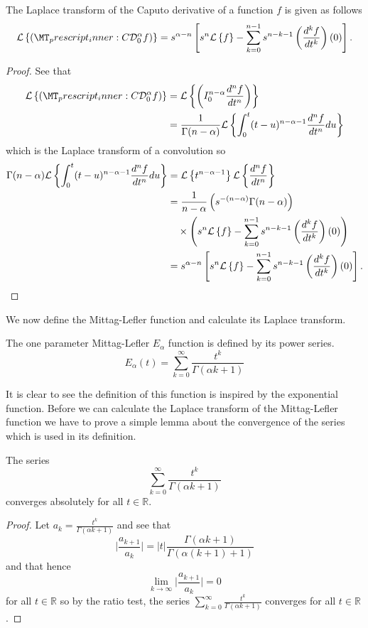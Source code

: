 \documentclass{unswmaths}
\begin{document}
\begin{lemma}
\label{lem:lap_cap}
	The Laplace transform of the Caputo derivative of  a function $ f $ is given as follows
	\begin{align*}
		\laplace{\capder{0}{\alpha}{f}} = s^{\alpha - n} \left[ s^n \laplace{f} - \sum_{k=0}^{n-1} s^{n-k-1} \left( \der{f}{t}{k} \right)(0) \right].
	\end{align*}
\end{lemma}
\begin{proof}
	See that
	\begin{align*}
		\laplace{\capder{0}{\alpha}{f}} &= \laplace{  \rli{0}{n-\alpha}{\der{f}{t}{n}}} \\
			&= \frac{1}{\Gamma(n-\alpha)}\laplace{ \int_0^t (t-u)^{n-\alpha-1} \der{f}{t}{n} du} \\ 
	\end{align*}
	which is the Laplace transform of a convolution so
	\begin{align*}
		\Gamma(n-\alpha)\mathcal{L} \left\{  \int_0^t (t-u)^{n-\alpha-1} \frac{d^{n}f}{dt^{n}} du \right\} &= \mathcal{L} \left\{ t^{n-\alpha-1} \right\} \mathcal{L} \left\{ \frac{d^{n}f}{dt^{n}} \right\} \\
		&= \frac{1}{n-\alpha} \left( s^{-(n-\alpha)} \Gamma(n-\alpha) \right) \\
		& \ \ \ \times \left( s^n \mathcal{L} \left\{ f \right\} - \sum_{k=0}^{n-1} s^{n-k-1} \left( \frac{d^{k}f}{dt^{k}} \right)(0) \right) \\
		&= s^{\alpha - n} \left[ s^n \mathcal{L} \left\{ f \right\} - \sum_{k=0}^{n-1} s^{n-k-1} \left( \frac{d^{k}f}{dt^{k}} \right)(0) \right].
	\end{align*}	
\end{proof}

We now define the Mittag-Lefler function and calculate its Laplace transform.

\begin{definition}
	The one parameter Mittag-Lefler $ E_\alpha $ function is defined by its power series.
	$$
		E_\alpha(t) = \sum_{k=0}^{\infty} \frac{t^k}{\Gamma(\alpha k + 1)}
	$$
\end{definition}
It is clear to see the definition of this function is inspired by the exponential function. Before we can calculate the 
Laplace transform of the Mittag-Lefler function we have to prove a simple lemma about the convergence of the 
series which is used in its definition.

\begin{lemma}
\label{lem:mit_conv}

	The series
	$$
		\sum_{k=0}^{\infty} \frac{t^k}{\Gamma(\alpha k + 1)} 
	$$
  	converges absolutely for all $ t \in \mathbb{R} $.
\end{lemma}
\begin{proof}
	Let $ a_k = \frac{t^k}{\Gamma(\alpha k + 1) }$ and see that
	$$ \lvert \frac{a_{k+1}}{a_k} \rvert = |t| \frac{\Gamma(\alpha k + 1) }{\Gamma(\alpha(k+1) + 1)} $$
	and that hence 
	$$
		\lim_{k \longrightarrow \infty} \lvert \frac{a_{k+1}}{a_k} \rvert = 0
	$$
	for all $ t \in \mathbb{R} $ so by the ratio test, the series $ \sum_{k=0}^{\infty} \frac{t^k}{\Gamma(\alpha k + 1)}  $
	converges for all $ t \in \mathbb{R} $.
\end{proof}
\end{document}
